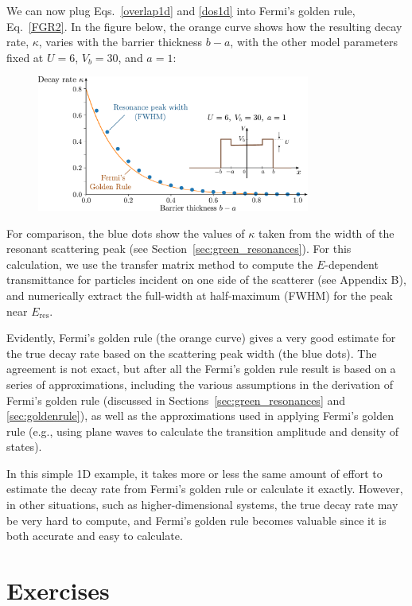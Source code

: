 \documentclass[pra,12pt]{revtex4}
\begin{document}
We can now plug Eqs.~\eqref{overlap1d} and \eqref{dos1d} into Fermi's
golden rule, Eq.~\eqref{FGR2}.  In the figure below, the orange curve
shows how the resulting decay rate, $\kappa$, varies with the barrier
thickness $b-a$, with the other model parameters fixed at $U = 6$,
$V_b = 30$, and $a = 1$:

\begin{figure}[h]
  \centering\includegraphics[width=0.8\textwidth]{goldenrule}
\end{figure}

\noindent
For comparison, the blue dots show the values of $\kappa$ taken from
the width of the resonant scattering peak (see
Section~\ref{sec:green_resonances}).  For this calculation, we use the
transfer matrix method to compute the $E$-dependent transmittance for
particles incident on one side of the scatterer (see Appendix B), and
numerically extract the full-width at half-maximum (FWHM) for the peak
near $E_{\mathrm{res}}$.

Evidently, Fermi's golden rule (the orange curve) gives a very good
estimate for the true decay rate based on the scattering peak width
(the blue dots).  The agreement is not exact, but after all the
Fermi's golden rule result is based on a series of approximations,
including the various assumptions in the derivation of Fermi's golden
rule (discussed in Sections~\ref{sec:green_resonances} and
\ref{sec:goldenrule}), as well as the approximations used in applying
Fermi's golden rule (e.g., using plane waves to calculate the
transition amplitude and density of states).

In this simple 1D example, it takes more or less the same amount of
effort to estimate the decay rate from Fermi's golden rule or
calculate it exactly.  However, in other situations, such as
higher-dimensional systems, the true decay rate may be very hard to
compute, and Fermi's golden rule becomes valuable since it is both
accurate and easy to calculate.

\section*{Exercises}
\end{document}
